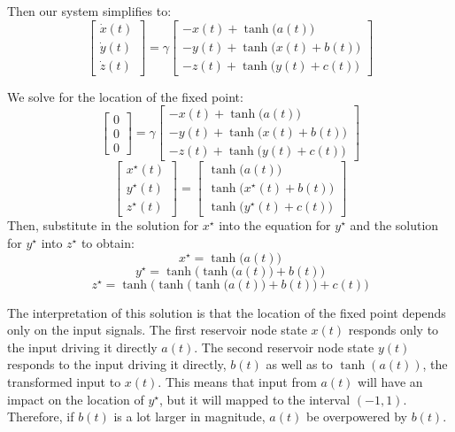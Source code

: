 \documentclass[12pt]{article}
\begin{document}
 Then our system simplifies to:
 \[
\begin{bmatrix} \dot{x}(t) \\ \dot{y}(t) \\ \dot{z}(t) \end{bmatrix}
=
\gamma \begin{bmatrix}
-x(t) + \tanh\Big( a(t) \Big) \\
-y(t) + \tanh\Big( x(t) + b(t) \Big)  \\
-z(t) + \tanh\Big( y(t) + c(t) \Big)
\end{bmatrix}
\]

We solve for the location of the fixed point:
 \[
\begin{bmatrix} 0 \\ 0 \\ 0  \end{bmatrix}
=
\gamma \begin{bmatrix}
-x(t) + \tanh\Big( a(t) \Big) \\
-y(t) + \tanh\Big( x(t) + b(t) \Big)  \\
-z(t) + \tanh\Big( y(t) + c(t) \Big)
\end{bmatrix}
\]
\[
\begin{bmatrix} x^\star(t) \\ y^\star(t) \\ z^\star(t) \end{bmatrix}
=
\begin{bmatrix}
\tanh\Big( a(t) \Big) \\
\tanh\Big( x^\star(t) + b(t) \Big)  \\
\tanh\Big( y^\star(t) + c(t) \Big)
\end{bmatrix}
\]
Then, substitute in the solution for $x^\star$ into the equation for $y^\star$ and the solution for $y^\star$ into $z^\star$ to obtain:
\[
x^\star = \tanh\big( a(t) \big)
\]
\[
y^\star = \tanh\big( \tanh\big( a(t) \big) + b(t) \big)
\]
\[
z^\star = \tanh \big( \tanh\big( \tanh\big( a(t) \big) + b(t) \big) + c(t) \big)
\]

The interpretation of this solution is that the location of the fixed point depends only on the input signals. The first reservoir node state $x(t)$ responds only to the input driving it directly $a(t)$. The second reservoir node state $y(t)$ responds to the input driving it directly, $b(t)$ as well as to $\tanh(a(t))$, the transformed input to $x(t)$. This means that input from $a(t)$ will have an impact on the location of $y^\star$, but it will mapped to the interval $(-1, 1)$. Therefore, if $b(t)$ is a lot larger in magnitude, $a(t)$ be overpowered by $b(t)$.
\end{document}
